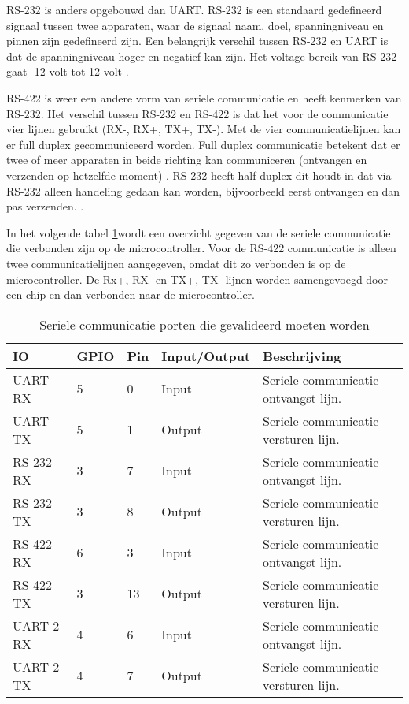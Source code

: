 \noindent RS-232 is anders opgebouwd dan UART. RS-232 is een standaard gedefineerd signaal tussen twee apparaten, waar de signaal naam, doel, spanningniveau en pinnen zijn gedefineerd zijn. Een belangrijk verschil tussen RS-232 en UART is dat de spanningniveau hoger en negatief kan zijn. Het voltage bereik van RS-232 gaat -12 volt tot 12 volt \autocite{RS232}. \newline

\noindent RS-422 is weer een andere vorm van seriele communicatie en heeft kenmerken van RS-232. Het verschil tussen RS-232 en RS-422 is dat het voor de communicatie vier lijnen gebruikt (RX-, RX+, TX+, TX-). Met de vier communicatielijnen kan er full duplex gecommuniceerd worden. Full duplex communicatie betekent dat er twee of meer apparaten in beide richting kan communiceren (ontvangen en verzenden op hetzelfde moment) \autocite{FullDuplex}. RS-232 heeft half-duplex dit houdt in dat via RS-232 alleen handeling gedaan kan worden, bijvoorbeeld eerst ontvangen en dan pas verzenden. \autocite{RS422}.

\noindent In het volgende tabel \ref{tab:hw_val_serieel}wordt een overzicht gegeven van de seriele communicatie die verbonden zijn op de microcontroller. Voor de RS-422 communicatie is alleen twee communicatielijnen aangegeven, omdat dit zo verbonden is op de microcontroller. De Rx+, RX- en TX+, TX- lijnen worden samengevoegd door een chip en dan verbonden naar de microcontroller.
\begin{table}[h!]
	\caption{Seriele communicatie porten die gevalideerd moeten worden}
	\begin{tabular}{llllp{9cm}}
	\toprule
	\textbf{IO} & \textbf{GPIO} & \textbf{Pin} & \textbf{Input/Output} & \textbf{Beschrijving}	\\ \toprule
	UART RX		& 5			& 0    	& Input		& Seriele communicatie ontvangst lijn.			\\
	UART TX		& 5			& 1    	& Output	& Seriele communicatie versturen lijn.			\\
	RS-232 RX	& 3			& 7    	& Input		& Seriele communicatie ontvangst lijn.			\\
	RS-232 TX	& 3			& 8    	& Output	& Seriele communicatie versturen lijn.			\\
	RS-422 RX	& 6			& 3    	& Input		& Seriele communicatie ontvangst lijn.			\\
	RS-422 TX	& 3			& 13   	& Output	& Seriele communicatie versturen lijn.			\\
	UART 2 RX	& 4			& 6    	& Input		& Seriele communicatie ontvangst lijn.			\\
	UART 2 TX	& 4			& 7   	& Output	& Seriele communicatie versturen lijn.			\\ \bottomrule
	\end{tabular}
	\label{tab:hw_val_serieel}
\end{table}